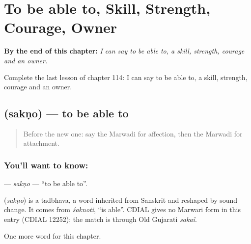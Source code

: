 
\chapter{To be able to, Skill, Strength, Courage, Owner}
\label{ch:mw-to-be-able-to-skill-strength-courage-owner}

\begin{chapteropening}
\textbf{By the end of this chapter:} \emph{I can say to be able to, a skill, strength, courage and an owner.}

Complete the last lesson of chapter 114: I can say to be able to, a skill, strength, courage and an owner.
\end{chapteropening}

\section[\texorpdfstring{\mw{सकणो} (sakṇo)}{सकणो (sakṇo)}]{ (sakṇo) — to be able to}

\label{lesson:MW-C114-sakno}



\begin{quote}
Before the new one: say the Marwadi for affection, then the Marwadi for attachment.
\end{quote}

\subsection*{You'll want to know: }
\textbf{} — \emph{sakṇo} — \textquotedblleft{}to be able to\textquotedblright{}.

\begin{cousinweb}
\textbf{} (\emph{sakṇo}) is a tadbhava, a word inherited from Sanskrit and reshaped by sound change. It comes from \emph{śaknoti}, \textquotedblleft{}is able\textquotedblright{}. CDIAL gives no Marwari form in this entry (CDIAL 12252); the match is through Old Gujarati \emph{sakaï}.
\end{cousinweb}

\begin{grammarlens}[title={What you've built}]
One more word for this chapter.
\end{grammarlens}

